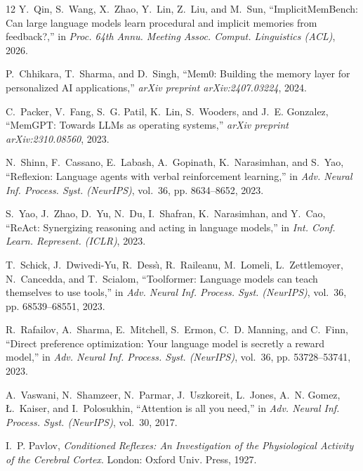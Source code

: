 \documentclass[11pt,journal,onecolumn]{IEEEtran}
\begin{document}
\begin{thebibliography}{12}
\fontsize{7.0pt}{7.9pt}\selectfont
\setlength{\itemsep}{0pt}
\setlength{\parskip}{0pt}
\setlength{\parsep}{0pt}
Y.~Qin, S.~Wang, X.~Zhao, Y.~Lin, Z.~Liu, and M.~Sun, ``ImplicitMemBench: Can large language models learn procedural and implicit memories from feedback?,'' in \emph{Proc. 64th Annu. Meeting Assoc. Comput. Linguistics (ACL)}, 2026.

P.~Chhikara, T.~Sharma, and D.~Singh, ``Mem0: Building the memory layer for personalized AI applications,'' \emph{arXiv preprint arXiv:2407.03224}, 2024.

C.~Packer, V.~Fang, S.~G. Patil, K.~Lin, S.~Wooders, and J.~E. Gonzalez, ``MemGPT: Towards LLMs as operating systems,'' \emph{arXiv preprint arXiv:2310.08560}, 2023.

N.~Shinn, F.~Cassano, E.~Labash, A.~Gopinath, K.~Narasimhan, and S.~Yao, ``Reflexion: Language agents with verbal reinforcement learning,'' in \emph{Adv. Neural Inf. Process. Syst. (NeurIPS)}, vol.~36, pp. 8634--8652, 2023.

S.~Yao, J.~Zhao, D.~Yu, N.~Du, I.~Shafran, K.~Narasimhan, and Y.~Cao, ``ReAct: Synergizing reasoning and acting in language models,'' in \emph{Int. Conf. Learn. Represent. (ICLR)}, 2023.

T.~Schick, J.~Dwivedi-Yu, R.~Dess{\`\i}, R.~Raileanu, M.~Lomeli, L.~Zettlemoyer, N.~Cancedda, and T.~Scialom, ``Toolformer: Language models can teach themselves to use tools,'' in \emph{Adv. Neural Inf. Process. Syst. (NeurIPS)}, vol.~36, pp. 68539--68551, 2023.

R.~Rafailov, A.~Sharma, E.~Mitchell, S.~Ermon, C.~D. Manning, and C.~Finn, ``Direct preference optimization: Your language model is secretly a reward model,'' in \emph{Adv. Neural Inf. Process. Syst. (NeurIPS)}, vol.~36, pp. 53728--53741, 2023.

A.~Vaswani, N.~Shamzeer, N.~Parmar, J.~Uszkoreit, L.~Jones, A.~N. Gomez, {\L}.~Kaiser, and I.~Polosukhin, ``Attention is all you need,'' in \emph{Adv. Neural Inf. Process. Syst. (NeurIPS)}, vol.~30, 2017.

I.~P. Pavlov, \emph{Conditioned Reflexes: An Investigation of the Physiological Activity of the Cerebral Cortex}. London: Oxford Univ. Press, 1927.


\end{thebibliography}
\end{document}
